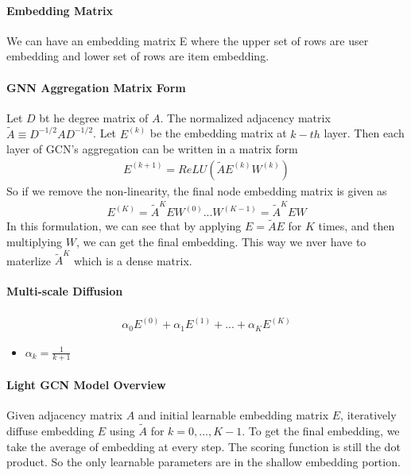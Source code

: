 \paragraph{Embedding Matrix} We can have an embedding matrix E where the upper set of rows are user embedding and lower set of rows are item embedding. 

\paragraph{GNN Aggregation Matrix Form} Let $D$ bt he degree matrix of $A$. The normalized adjacency matrix $\tilde{A} \equiv D^{-1/2} A D^{-1/2}$. Let $E^{(k)}$ be the embedding matrix at $k-th$ layer. Then each layer of GCN's aggregation can be written in a matrix form 
    \begin{align*}
        E^{(k+1)} = ReLU(\tilde{A}E^{(k)}W^{(k)})
    \end{align*}
So if we remove the non-linearity, the final node embedding matrix is given as 
    \begin{align*}
        E^{(K)} = \tilde{A}^K E W^{(0)}...W^{(K-1)} = \tilde{A}^K E W
    \end{align*}
In this formulation, we can see that by applying $E = \tilde{A}E$ for $K$ times, and then multiplying $W$, we can get the final embedding. This way we nver have to materlize $\tilde{A}^K$ which is a dense matrix. 

\paragraph{Multi-scale Diffusion} 
    \begin{align*}
        \alpha_0E^{(0)} + \alpha_1 E^{(1)} + ... + \alpha_K  E^{(K)}
    \end{align*}
    \begin{itemize}
        \item $\alpha_k = \frac{1}{k+1}$
    \end{itemize}
    
\paragraph{Light GCN Model Overview} 
Given adjacency matrix $A$ and initial learnable embedding matrix $E$, iteratively diffuse embedding $E$ using $\tilde{A}$ for $k=0,...,K-1$. To get the final embedding, we take the average of embedding at every step. The scoring function is still the dot product. So the only learnable parameters are in the shallow embedding portion. 


